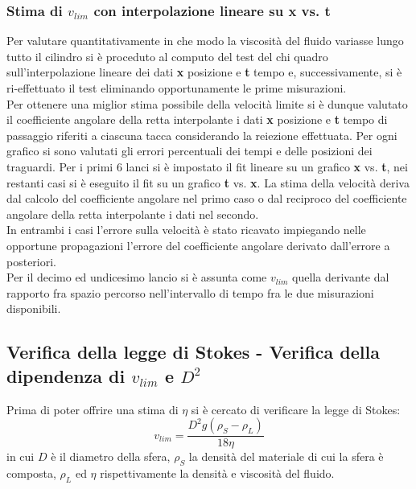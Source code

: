 \documentclass[a4paper,11pt,oneside]{article}
\begin{document}
\subsubsection*{Stima di $v_{lim}$ con interpolazione lineare su x vs. t}
Per valutare quantitativamente in che modo la viscosità del fluido variasse lungo tutto il cilindro si è proceduto al computo del test del chi quadro sull'interpolazione lineare dei dati \textbf{x} posizione e \textbf{t} tempo e, successivamente, si è ri-effettuato il test eliminando opportunamente le prime misurazioni.\\


Per ottenere una miglior stima possibile della velocità limite si è dunque valutato il coefficiente angolare della retta interpolante i dati \textbf{x} posizione e \textbf{t} tempo di passaggio riferiti a ciascuna tacca considerando la reiezione effettuata. \newline
Per ogni grafico si sono valutati gli errori percentuali dei tempi e delle posizioni dei traguardi.
Per i primi 6 lanci si è impostato il fit lineare su un grafico \textbf{x} vs. \textbf{t}, nei restanti casi si è eseguito il fit su un grafico \textbf{t} vs. \textbf{x}. La stima della velocità deriva dal calcolo del coefficiente angolare nel primo caso o dal reciproco del coefficiente angolare della retta interpolante i dati nel secondo.\\

In entrambi i casi l'errore sulla velocità è stato ricavato impiegando nelle opportune propagazioni l'errore del coefficiente angolare derivato dall'errore a posteriori.\\


Per il decimo ed undicesimo lancio si è assunta come $v_{lim}$ quella derivante dal rapporto fra spazio percorso nell'intervallo di tempo fra le due misurazioni disponibili. 


 



\subsection{Verifica della legge di Stokes - Verifica della dipendenza di $v_{lim}$ e $D^2$}
Prima di poter offrire una stima di $\eta$ si è cercato di verificare la legge di Stokes:
\begin{equation*}
    v_{lim}= \frac{{D}^2g\left(\rho_S - \rho_L\right)}{18 \eta }
\end{equation*}
in cui $D$ è il diametro della sfera, $\rho_S$ la densità del materiale di cui la sfera è composta, $\rho_L$ ed $\eta$ rispettivamente la densità e viscosità del fluido.
\end{document}
